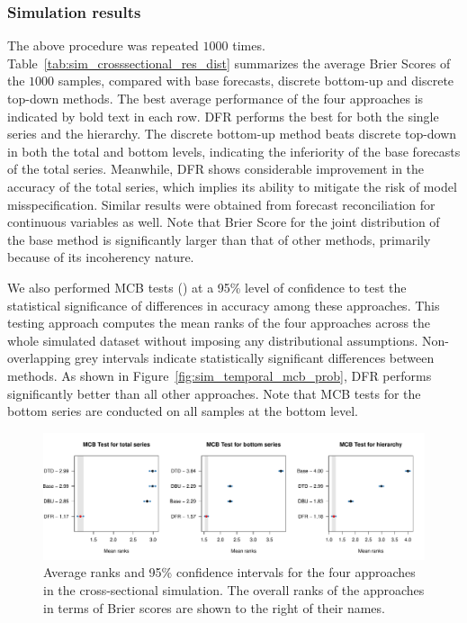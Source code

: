 \documentclass[a4paper,review,12pt,authoryear]{elsarticle}
\theoremstyle{definition}
\begin{document}
    \subsubsection{Simulation results}
    The above procedure was repeated $1000$ times.
    Table~\ref{tab:sim_crosssectional_res_dist} summarizes the average Brier Scores of the $1000$ samples, compared with base forecasts, discrete bottom-up and discrete top-down methods.
    The best average performance of the four approaches is indicated by bold text in each row.
    DFR performs the best for both the single series and the hierarchy.
    The discrete bottom-up method beats discrete top-down in both the total and bottom levels, indicating the inferiority of the base forecasts of the total series.
    Meanwhile, DFR shows considerable improvement in the accuracy of the total series, which implies its ability to mitigate the risk of model misspecification.
    Similar results were obtained from forecast reconciliation for continuous variables as well.
    Note that Brier Score for the joint distribution of the base method is significantly larger than that of other methods, primarily because of its incoherency nature.

    We also performed MCB tests (\citealp{koningM3CompetitionStatistical2005}) at a 95\% level of confidence to test the statistical significance of differences in accuracy among these approaches.
    This testing approach computes the mean ranks of the four approaches across the whole simulated dataset without imposing any distributional assumptions.
    Non-overlapping grey intervals indicate statistically significant differences between methods.
    As shown in Figure~\ref{fig:sim_temporal_mcb_prob}, DFR performs significantly better than all other approaches.
    Note that MCB tests for the bottom series are conducted on all samples at the bottom level.

    \begin{figure}
      \centering
      \label{fig:mcb_crosssectional}
      \caption{Average ranks and 95\% confidence intervals for the four approaches in the cross-sectional simulation. The overall ranks of the approaches in terms of Brier scores are shown to the right of their names.}
      \includegraphics[width=\textwidth]{figures/cross_sectional_mcb.pdf}
    \end{figure}
\end{document}
